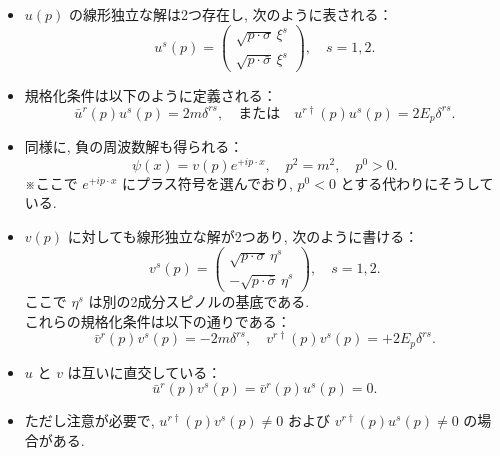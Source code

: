 \documentclass[a4paper,12pt]{article}
\begin{document}
\begin{itemize}
  \item $u(p)$ の線形独立な解は2つ存在し, 次のように表される：
  \begin{equation*}
    u^s(p) =
    \begin{pmatrix}
      \sqrt{p \cdot \sigma} \, \xi^s \\
      \sqrt{p \cdot \bar{\sigma}} \, \xi^s
    \end{pmatrix}, \quad s = 1, 2. \tag{3.59}
  \end{equation*}

  \item 規格化条件は以下のように定義される：
  \begin{equation*}
    \bar{u}^r(p) u^s(p) = 2m \delta^{rs}, \quad \text{または} \quad
    u^{r\dagger}(p) u^s(p) = 2E_p \delta^{rs}. \tag{3.60}
  \end{equation*}

  \item 同様に, 負の周波数解も得られる：
  \begin{equation*}
    \psi(x) = v(p)e^{+ip \cdot x}, \quad p^2 = m^2, \quad p^0 > 0. \tag{3.61}
  \end{equation*}
  ※ここで $e^{+ip \cdot x}$ にプラス符号を選んでおり, $p^0 < 0$ とする代わりにそうしている.
  \item $v(p)$ に対しても線形独立な解が2つあり, 次のように書ける：
  \begin{equation*}
    v^s(p) =
    \begin{pmatrix}
      \sqrt{p \cdot \sigma} \, \eta^s \\
      -\sqrt{p \cdot \bar{\sigma}} \, \eta^s
    \end{pmatrix}, \quad s = 1, 2. \tag{3.62}
  \end{equation*}
  ここで $\eta^s$ は別の2成分スピノルの基底である.\\
  これらの規格化条件は以下の通りである：
  \begin{equation*}
    \bar{v}^r(p) v^s(p) = -2m \delta^{rs}, \quad
    v^{r\dagger}(p) v^s(p) = +2E_p \delta^{rs}. \tag{3.63}
  \end{equation*}

  \item $u$ と $v$ は互いに直交している：
  \begin{equation*}
    \bar{u}^r(p) v^s(p) = \bar{v}^r(p) u^s(p) = 0. \tag{3.64}
  \end{equation*}

  \item ただし注意が必要で, $u^{r\dagger}(p) v^s(p) \ne 0$ および $v^{r\dagger}(p) u^s(p) \ne 0$ の場合がある.


\end{itemize}
\end{document}
